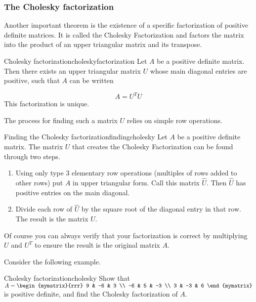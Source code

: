 \subsubsection{The Cholesky factorization}

Another important theorem is the existence of a specific factorization of positive definite matrices. It is called the Cholesky Factorization and factors the matrix into the product of an upper triangular matrix and its transpose.

\begin{theorem}{Cholesky factorization}{choleskyfactorization}
Let $A$ be a positive definite matrix. Then
there exists an upper triangular matrix $U$ whose main diagonal entries are positive, such that $A$ can be written

\begin{equation*}
A=
U^TU
\end{equation*}
This factorization is unique.
\end{theorem}

The process for finding such a matrix $U$ relies on simple row operations.

\begin{procedure}{Finding the Cholesky factorization}{findingcholesky}
Let $A$ be a positive definite matrix. The matrix $U$ that creates the Cholesky Factorization can be found through two steps.
\begin{enumerate}
\item Using only type $3$ elementary row operations (multiples of rows added to other rows) put $A$ in upper triangular form. Call this matrix $\hat{U}$. Then $\hat{U}$ has positive entries on the main diagonal. 
\item Divide each row of $\hat{U}$ by the square root of the diagonal entry in that row. The result is the matrix $U$. 
\end{enumerate}
\end{procedure}

Of course you can always verify that your factorization is correct by multiplying $U$ and $U^T$ to ensure the result is the original matrix $A$. 

Consider the following example.

\begin{example}{Cholesky factorization}{cholesky}
Show that
$A=\begin{mymatrix}{rrr}
9 & -6 & 3 \\ -6 & 5 & -3 \\ 3 & -3 & 6 
\end{mymatrix}$ 
is positive definite, and find the Cholesky factorization of $A$.
\end{example}

